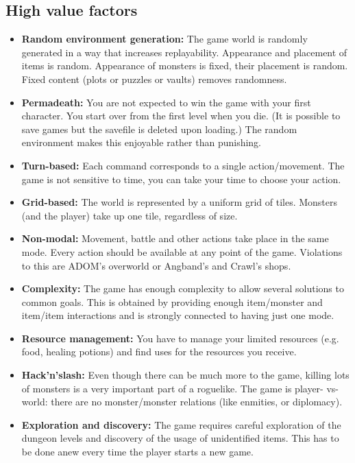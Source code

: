 \documentclass{article}
\begin{document}
\subsection*{High value factors}
\begin{itemize}

\item\textbf{Random environment generation:}
The game world is randomly generated in a way that increases 
replayability. Appearance and placement of items is random. 
Appearance of monsters is fixed, their placement is random. 
Fixed content (plots or puzzles or vaults) removes randomness. 

\item\textbf{Permadeath:} 
 You are not expected to win the game with your first character. You 
start over from the first level when you die. (It is possible to save 
games but the savefile is deleted upon loading.) The random 
environment makes this enjoyable rather than punishing. 

\item\textbf{Turn-based:}
Each command corresponds to a single action/movement. The game is not 
sensitive to time, you can take your time to choose your action.   

\item\textbf{Grid-based:} 
The world is represented by a uniform grid of tiles. Monsters (and 
the player) take up one tile, regardless of size. 

\item\textbf{Non-modal:} 
Movement, battle and other actions take place in the same mode. Every 
action should be available at any point of the game. Violations to 
this are ADOM's overworld or Angband's and Crawl's shops. 

\item\textbf{Complexity:} 
The game has enough complexity to allow several solutions to common 
goals. This is obtained by providing enough item/monster and item/item 
interactions and is strongly connected to having just one mode. 

\item\textbf{Resource management:} 
You have to manage your limited resources (e.g. food, healing potions) 
and find uses for the resources you receive. 

\item\textbf{Hack'n'slash:}
Even though there can be much more to the game, killing lots of 
monsters is a very important part of a roguelike. The game is player- 
vs-world: there are no monster/monster relations (like enmities, or 
diplomacy).  

\item\textbf{Exploration and discovery:} 
The game requires careful exploration of the dungeon levels and 
discovery of the usage of unidentified items. This has to be done anew 
every time the player starts a new game.

\end{itemize}
\end{document}
